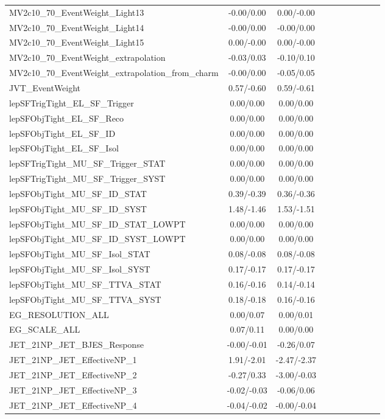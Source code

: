 \begin{table}[h]
\begin{center}
\begin{tabular}{l|ccccccccc}
MV2c10\_70\_EventWeight\_Light13 &-0.00/0.00 &0.00/-0.00 \\
MV2c10\_70\_EventWeight\_Light14 &-0.00/0.00 &-0.00/0.00 \\
MV2c10\_70\_EventWeight\_Light15 &0.00/-0.00 &0.00/-0.00 \\
MV2c10\_70\_EventWeight\_extrapolation &-0.03/0.03 &-0.10/0.10 \\
MV2c10\_70\_EventWeight\_extrapolation\_from\_charm &-0.00/0.00 &-0.05/0.05 \\
JVT\_EventWeight &0.57/-0.60 &0.59/-0.61 \\
lepSFTrigTight\_EL\_SF\_Trigger &0.00/0.00 &0.00/0.00 \\
lepSFObjTight\_EL\_SF\_Reco &0.00/0.00 &0.00/0.00 \\
lepSFObjTight\_EL\_SF\_ID &0.00/0.00 &0.00/0.00 \\
lepSFObjTight\_EL\_SF\_Isol &0.00/0.00 &0.00/0.00 \\
lepSFTrigTight\_MU\_SF\_Trigger\_STAT &0.00/0.00 &0.00/0.00 \\
lepSFTrigTight\_MU\_SF\_Trigger\_SYST &0.00/0.00 &0.00/0.00 \\
lepSFObjTight\_MU\_SF\_ID\_STAT &0.39/-0.39 &0.36/-0.36 \\
lepSFObjTight\_MU\_SF\_ID\_SYST &1.48/-1.46 &1.53/-1.51 \\
lepSFObjTight\_MU\_SF\_ID\_STAT\_LOWPT &0.00/0.00 &0.00/0.00 \\
lepSFObjTight\_MU\_SF\_ID\_SYST\_LOWPT &0.00/0.00 &0.00/0.00 \\
lepSFObjTight\_MU\_SF\_Isol\_STAT &0.08/-0.08 &0.08/-0.08 \\
lepSFObjTight\_MU\_SF\_Isol\_SYST &0.17/-0.17 &0.17/-0.17 \\
lepSFObjTight\_MU\_SF\_TTVA\_STAT &0.16/-0.16 &0.14/-0.14 \\
lepSFObjTight\_MU\_SF\_TTVA\_SYST &0.18/-0.18 &0.16/-0.16 \\
EG\_RESOLUTION\_ALL &0.00/0.07 &0.00/0.01 \\
EG\_SCALE\_ALL &0.07/0.11 &0.00/0.00 \\
JET\_21NP\_JET\_BJES\_Response &-0.00/-0.01 &-0.26/0.07 \\
JET\_21NP\_JET\_EffectiveNP\_1 &1.91/-2.01 &-2.47/-2.37 \\
JET\_21NP\_JET\_EffectiveNP\_2 &-0.27/0.33 &-3.00/-0.03 \\
JET\_21NP\_JET\_EffectiveNP\_3 &-0.02/-0.03 &-0.06/0.06 \\
JET\_21NP\_JET\_EffectiveNP\_4 &-0.04/-0.02 &-0.00/-0.04 \\

\end{tabular}
\end{center}
\end{table}
